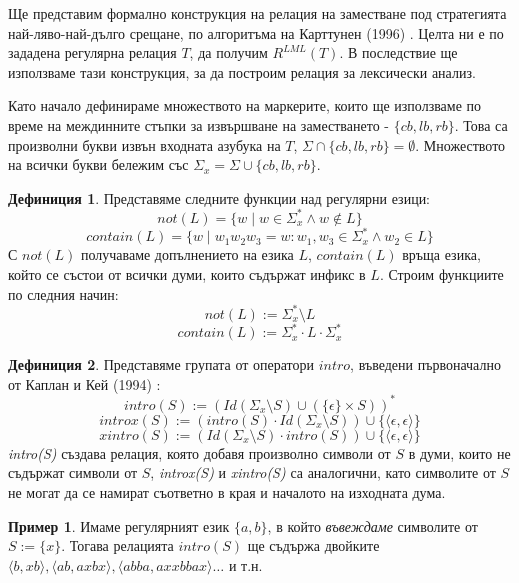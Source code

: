 \documentclass[12pt, oneside]{article}
\theoremstyle{definition}
\newtheorem{definition}{Дефиниция}[section]
\newtheorem{example}{Пример}[section]
\begin{document}
Ще представим формално конструкция на релация на заместване под стратегията най-ляво-най-дълго срещане, по алгоритъма на Карттунен (1996) \cite{Karttunen:96}. Целта ни е по зададена регулярна релация \(T\), да получим \( R^{LML}(T) \). В последствие ще използваме тази конструкция, за да построим релация за лексически анализ.

Като начало дефинираме множеството на маркерите, които ще използваме по време на междинните стъпки за извършване на заместването - \( \{ cb, lb, rb \} \). Това са произволни букви извън входната азубука на \(T\), \( \Sigma \cap \{ cb, lb, rb \} = \emptyset \). Множеството на всички букви бележим със \( \Sigma_x = \Sigma \cup \{ cb, lb, rb \} \). 

\begin{definition}
	Представяме следните функции над регулярни езици:
	\[ not(L) = \{ w \mid w \in \Sigma_x^* \land w \notin L \} \]
	\[ contain(L) = \{ w \mid w_1w_2w_3 = w: w_1, w_3 \in \Sigma_x^* \land w_2 \in L \} \]
	С \( not(L) \) получаваме допълнението на езика \(L\), \( contain(L) \) връща езика, който се състои от всички думи, които съдържат инфикс в \(L\). Строим функциите по следния начин:
	\[ not(L) := \Sigma_x^* \setminus L \]
	\[ contain(L) := \Sigma_x^* \cdot L \cdot \Sigma_x^* \]
\end{definition}

\begin{definition}
	Представяме групата от оператори \(intro\), въведени първоначално от Каплан и Кей (1994) \cite{Kaplan&Kay:94}:
	\[ intro(S) := (Id(\Sigma_x \setminus S) \cup (\{\epsilon\} \times S))^* \]
	\[ introx(S) := (intro(S) \cdot Id(\Sigma_x \setminus S)) \cup \{\langle \epsilon, \epsilon \rangle \} \]
	\[ xintro(S) := (Id(\Sigma_x \setminus S) \cdot intro(S)) \cup \{\langle \epsilon, \epsilon \rangle \} \]
	\emph{intro(S)} създава релация, която добавя произволно символи от \(S\) в думи, които не съдържат символи от \(S\), \emph{introx(S)} и \emph{xintro(S)} са аналогични, като символите от \(S\) не могат да се намират съответно в края и началото на изходната дума.
\end{definition}

\begin{example}
	Имаме регулярният език \( \{a,b\} \), в който \emph{въвеждаме} символите от \(S := \{ x \}\). Тогава релацията \(intro(S)\) ще съдържа двойките \( \langle b, xb \rangle, \langle ab, axbx \rangle, \langle abba, axxbbax \rangle \dots \) и т.н.
\end{example}
\end{document}
